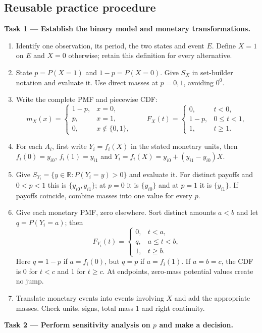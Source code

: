 \subsection{Reusable practice procedure}
\textbf{Task 1 --- Establish the binary model and monetary transformations.}
\begin{enumerate}
\item Identify one observation, its period, the two states and event $E$.
Define $X=1$ on $E$ and $X=0$ otherwise; retain this definition for every alternative.
\item State $p=P(X=1)$ and $1-p=P(X=0)$. Give $S_X$ in set-builder notation
and evaluate it. Use direct masses at $p=0,1$, avoiding $0^0$.
\item Write the complete PMF and piecewise CDF:
\[
m_X(x)=\begin{cases}1-p,&x=0,\\p,&x=1,\\0,&x\notin\{0,1\},\end{cases}
\qquad
F_X(t)=\begin{cases}0,&t<0,\\1-p,&0\leq t<1,\\1,&t\geq1.\end{cases}
\]
\item For each $A_i$, first write $Y_i=f_i(X)$ in the stated monetary units,
then $f_i(0)=y_{i0}$, $f_i(1)=y_{i1}$ and
$Y_i=f_i(X)=y_{i0}+(y_{i1}-y_{i0})X$.
\item Give $S_{Y_i}=\{y\in\mathbb R:P(Y_i=y)>0\}$ and evaluate it.
For distinct payoffs and $0<p<1$ this is $\{y_{i0},y_{i1}\}$;
at $p=0$ it is $\{y_{i0}\}$ and at $p=1$ it is $\{y_{i1}\}$.
If payoffs coincide, combine masses into one value for every $p$.
\item Give each monetary PMF, zero elsewhere. Sort distinct amounts
$a<b$ and let $q=P(Y_i=a)$; then
\[
F_{Y_i}(t)=\begin{cases}0,&t<a,\\q,&a\leq t<b,\\1,&t\geq b.\end{cases}
\]
Here $q=1-p$ if $a=f_i(0)$, but $q=p$ if $a=f_i(1)$.
If $a=b=c$, the CDF is 0 for $t<c$ and 1 for $t\geq c$.
At endpoints, zero-mass potential values create no jump.
\item Translate monetary events into events involving $X$ and add the
appropriate masses. Check units, signs, total mass 1 and right continuity.
\end{enumerate}
\textbf{Task 2 --- Perform sensitivity analysis on $p$ and make a decision.}
